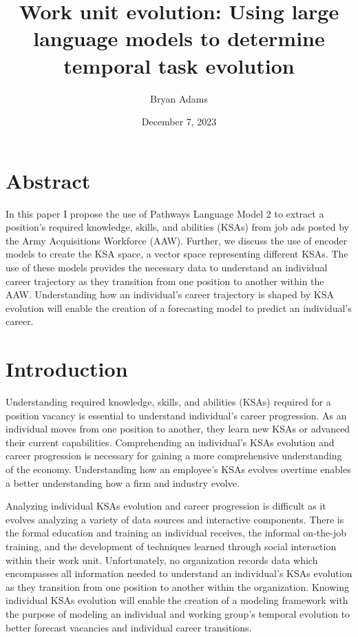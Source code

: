 \documentclass[12pt]{article}
\title{\sc Work unit evolution: Using large language models to determine temporal task evolution}
\author{Bryan Adams}
\date{December 7, 2023}
\begin{document}
\maketitle

\section*{Abstract}

In this paper I propose the use of Pathways Language Model 2 to extract a position's required knowledge, skills, and abilities (KSAs) from job ads posted by the Army Acquisitions Workforce (AAW). Further, we discuss the use of encoder models to create the KSA space, a vector space representing different KSAs. The use of these models provides the necessary data to understand an individual career trajectory as they transition from one position to another within the AAW. Understanding how an individual's career trajectory is shaped by KSA evolution will enable the creation of a forecasting model to predict an individual's career.

\section{Introduction}

Understanding required knowledge, skills, and abilities (KSAs) required for a position vacancy is essential to understand individual's career progression. As an individual moves from one position to another, they learn new KSAs or advanced their current capabilities. Comprehending an individual's KSAs evolution and career progression is necessary for gaining a more comprehensive understanding of the economy. Understanding how an employee's KSAs evolves overtime enables a better understanding how a firm and industry evolve. 

Analyzing individual KSAs evolution and career progression is difficult as it evolves analyzing a variety of data sources and interactive components. There is the formal education and training an individual receives, the informal on-the-job training, and the development of techniques learned through social interaction within their work unit. Unfortunately, no organization records data which encompasses all information needed to understand an individual's KSAs evolution as they transition from one position to another within the organization. Knowing individual KSAs evolution will enable the creation of a modeling framework with the purpose of modeling an individual and working group's temporal evolution to better forecast vacancies and individual career transitions. 
\end{document}
